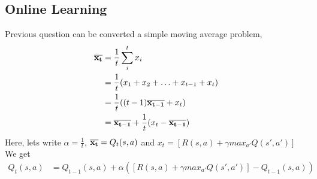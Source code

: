 \documentclass[11pt]{amsart}
\begin{document}
\subsection{Online Learning}
Previous question can be converted a simple moving average problem, 
%
%
\begin{equation} \label{eq1}
\begin{split}
\bold{\overline{x_t}} & = \frac{1}{t}\sum^{t}_{i} x_i \\
              & = \frac{1}{t} (x_1 + x_2 + \ldots + x_{t-1} + x_t)\\
               & = \frac{1}{t} ( (t-1)\bold{\overline{x_{t-1}} } + x_t)\\
               & = \bold{\overline{x_{t-1}}} + \frac{1}{t} (x_t - \bold{\overline{x_{t-1}}})\\
\end{split}
\end{equation}
%
%
Here, lets write $\alpha =  \frac{1}{t} $, $\bold{\overline{x_t}}  = Q_t(s,a)$ and $x_t = [R(s,a) + \gamma max_{a'} Q(s',a')] $
%
\vspace{1cm}
We get
\begin{equation} \label{eq2}
\begin{split}
Q_t(s,a) & = Q_{t-1}(s,a) + \alpha ([R(s,a) + \gamma max_{a'} Q(s',a')]  - Q_{t-1}(s,a) )\\
\end{split}
\end{equation}
\end{document}

